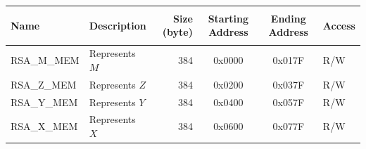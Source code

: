 \begin{longtable}{ | l | l | r | c | c | l | }
\hline\rowcolor{lightgray}\label{tab:rsa-mem}

\textbf{Name} & \textbf{Description}  &  \textbf{Size (byte)}  &  \textbf{Starting Address}  &  \textbf{Ending Address}  & \textbf{Access}   \\ \hline
RSA\_M\_MEM & Represents \begin{math}M\end{math}  & 384  & 0x0000 & 0x017F & R/W \\ \hline
RSA\_Z\_MEM & Represents \begin{math}Z\end{math}  & 384  & 0x0200 & 0x037F & R/W \\ \hline
RSA\_Y\_MEM & Represents \begin{math}Y\end{math}  & 384  & 0x0400 & 0x057F & R/W \\ \hline
RSA\_X\_MEM & Represents \begin{math}X\end{math}  & 384  & 0x0600 & 0x077F & R/W \\ \hline
\end{longtable}

